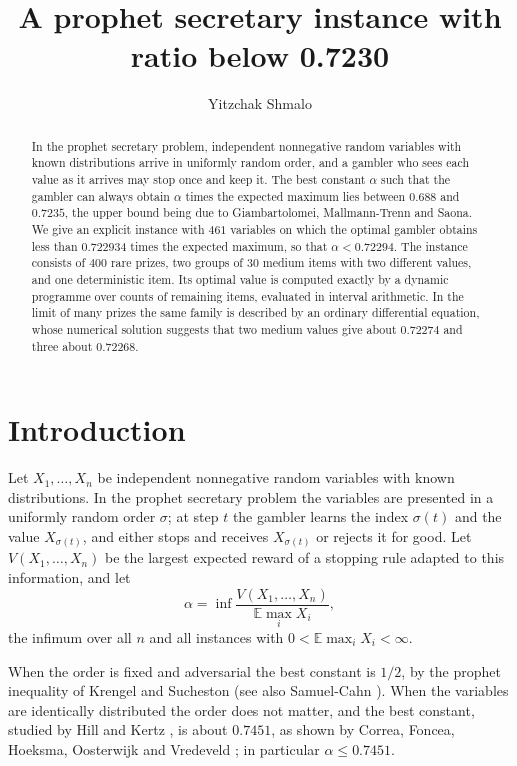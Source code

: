 \documentclass[11pt]{amsart}
\title[A prophet secretary instance below 0.7235]{A prophet secretary instance with ratio below 0.7230}
\author{Yitzchak Shmalo}
\theoremstyle{remark}\newtheorem{remark}[theorem]{Remark}
\newcommand{\E}{\mathbb{E}}
\begin{document}
\begin{abstract}
In the prophet secretary problem, independent nonnegative random variables with known distributions arrive in
uniformly random order, and a gambler who sees each value as it arrives may stop once and keep it. The best constant
$\alpha$ such that the gambler can always obtain $\alpha$ times the expected maximum lies between $0.688$ and $0.7235$,
the upper bound being due to Giambartolomei, Mallmann-Trenn and Saona. We give an explicit instance with $461$
variables on which the optimal gambler obtains less than $0.722934$ times the expected maximum, so that
$\alpha<0.72294$. The instance consists of $400$ rare prizes, two groups of $30$ medium items with two different
values, and one deterministic item. Its optimal value is computed exactly by a dynamic programme over counts of
remaining items, evaluated in interval arithmetic. In the limit of many prizes the same family is described by an
ordinary differential equation, whose numerical solution suggests that two medium values give about $0.72274$ and
three about $0.72268$.
\end{abstract}
\maketitle

\section{Introduction}

Let $X_1,\dots,X_n$ be independent nonnegative random variables with known distributions. In the prophet secretary
problem the variables are presented in a uniformly random order $\sigma$; at step $t$ the gambler learns the index
$\sigma(t)$ and the value $X_{\sigma(t)}$, and either stops and receives $X_{\sigma(t)}$ or rejects it for good. Let
$V(X_1,\dots,X_n)$ be the largest expected reward of a stopping rule adapted to this information, and let
\[
\alpha=\inf\frac{V(X_1,\dots,X_n)}{\E\max_i X_i},
\]
the infimum over all $n$ and all instances with $0<\E\max_i X_i<\infty$.

When the order is fixed and adversarial the best constant is $1/2$, by the prophet inequality of Krengel and Sucheston
\cite{ks} (see also Samuel-Cahn \cite{sc84}). When the variables are identically distributed the order does not matter,
and the best constant, studied by Hill and Kertz \cite{hk}, is about $0.7451$, as shown by Correa, Foncea, Hoeksma,
Oosterwijk and Vredeveld \cite{cfhov}; in particular $\alpha\le0.7451$.
\end{document}
